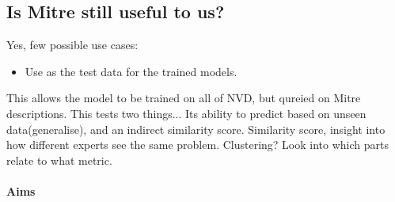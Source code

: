 \documentclass[11pt]{article}
\begin{document}
\subsection{Is Mitre still useful to us?}

Yes, few possible use cases:

\begin{itemize}
	\item Use as the test data for the trained models.
\end{itemize}

This allows the model to be trained on all of NVD, but qureied on Mitre descriptions. This tests two
things... Its ability to predict based on unseen data(generalise), and an indirect similarity score.
Similarity score, insight into how different experts see the same problem.
Clustering? Look into which parts relate to what metric.



\paragraph{Aims}
\noindent
\end{document}
